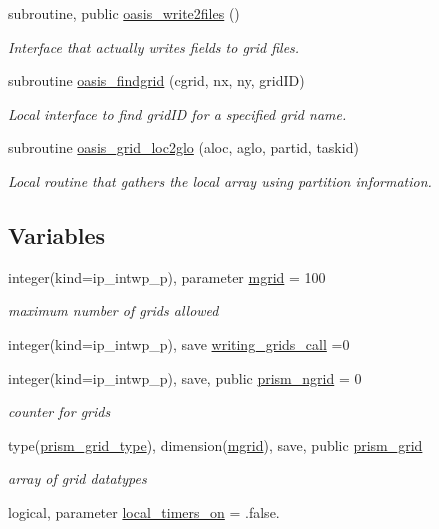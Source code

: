 \begin{DoxyCompactItemize}
subroutine, public \hyperlink{namespacemod__oasis__grid_a275791c512cefae9799e188d92b6f9d4}{oasis\+\_\+write2files} ()
\begin{DoxyCompactList}\small\item\em Interface that actually writes fields to grid files. \end{DoxyCompactList}\item 
subroutine \hyperlink{namespacemod__oasis__grid_aa1b2c3dc81299472185c1e7142d143e0}{oasis\+\_\+findgrid} (cgrid, nx, ny, grid\+ID)
\begin{DoxyCompactList}\small\item\em Local interface to find grid\+ID for a specified grid name. \end{DoxyCompactList}\item 
subroutine \hyperlink{namespacemod__oasis__grid_a5aba1fce549be5f9db2fda5374d588e1}{oasis\+\_\+grid\+\_\+loc2glo} (aloc, aglo, partid, taskid)
\begin{DoxyCompactList}\small\item\em Local routine that gathers the local array using partition information. \end{DoxyCompactList}\end{DoxyCompactItemize}
\subsection*{Variables}
\begin{DoxyCompactItemize}
\item 
integer(kind=ip\+\_\+intwp\+\_\+p), parameter \hyperlink{namespacemod__oasis__grid_a9df267c5d7acbb73eb35d6aaf10ab59e}{mgrid} = 100
\begin{DoxyCompactList}\small\item\em maximum number of grids allowed \end{DoxyCompactList}\item 
integer(kind=ip\+\_\+intwp\+\_\+p), save \hyperlink{namespacemod__oasis__grid_a587c160986cc015e4367b1cca13babfb}{writing\+\_\+grids\+\_\+call} =0
\item 
integer(kind=ip\+\_\+intwp\+\_\+p), save, public \hyperlink{namespacemod__oasis__grid_ad6e65eb9872825ac98db6ce1f7dcd618}{prism\+\_\+ngrid} = 0
\begin{DoxyCompactList}\small\item\em counter for grids \end{DoxyCompactList}\item 
type(\hyperlink{structmod__oasis__grid_1_1prism__grid__type}{prism\+\_\+grid\+\_\+type}), dimension(\hyperlink{namespacemod__oasis__grid_a9df267c5d7acbb73eb35d6aaf10ab59e}{mgrid}), save, public \hyperlink{namespacemod__oasis__grid_a43b75282e77fd687bd7173f4f78abcb1}{prism\+\_\+grid}
\begin{DoxyCompactList}\small\item\em array of grid datatypes \end{DoxyCompactList}\item 
logical, parameter \hyperlink{namespacemod__oasis__grid_a88908301f4dba06278e75e79f90b1155}{local\+\_\+timers\+\_\+on} = .false.
\end{DoxyCompactItemize}


